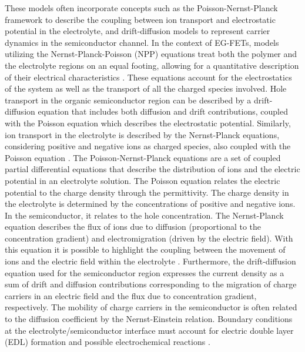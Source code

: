 These models often incorporate concepts such as the Poisson-Nernst-Planck framework to describe the coupling between ion transport and electrostatic potential in the electrolyte, and drift-diffusion models to represent carrier dynamics in the semiconductor channel. In the context of EG-FETs, models utilizing the Nernst-Planck-Poisson (NPP) equations treat both the polymer and the electrolyte regions on an equal footing, allowing for a quantitative description of their electrical characteristics \citep{delavariNernst2021,chennitInkjetPrinted2023}. These equations account for the electrostatics of the system as well as the transport of all the charged species involved. Hole transport in the organic semiconductor region can be described by a drift-diffusion equation that includes both diffusion and drift contributions, coupled with the Poisson equation which describes the electrostatic potential. Similarly, ion transport in the electrolyte is described by the Nernst-Planck equations, considering positive and negative ions as charged species, also coupled with the Poisson equation \citep{delavariNernst2021,chennitInkjetPrinted2023}.
The Poisson-Nernst-Planck equations are a set of coupled partial differential equations that describe the distribution of ions and the electric potential in an electrolyte solution. The Poisson equation relates the electric potential to the charge density through the permittivity. The charge density in the electrolyte is determined by the concentrations of positive and negative ions. In the semiconductor, it relates to the hole concentration.
The Nernst-Planck equation describes the flux of ions due to diffusion (proportional to the concentration gradient) and electromigration (driven by the electric field). With this equation it is possible to highlight the coupling between the movement of ions and the electric field within the electrolyte \citep{delavariNernst2021,chennitInkjetPrinted2023}.
Furthermore, the drift-diffusion equation used for the semiconductor region expresses the current density as a sum of drift and diffusion contributions corresponding to the migration of charge carriers in an electric field and the flux due to concentration gradient, respectively. The mobility of charge carriers in the semiconductor is often related to the diffusion coefficient by the Nernst-Einstein relation. Boundary conditions at the electrolyte/semiconductor interface must account for electric double layer (EDL) formation and possible electrochemical reactions \citep{delavariNernst2021,chennitInkjetPrinted2023}. 


